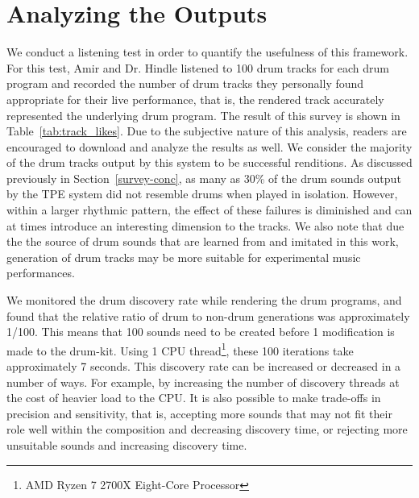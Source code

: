\documentclass[\main/thesis.tex]{subfiles}
\begin{document}
\section{Analyzing the Outputs}
 We conduct a listening test in order to quantify the usefulness of this framework. For this test, Amir and Dr. Hindle  listened to 100 drum tracks for each drum program and recorded the number of drum tracks they personally found appropriate for their live performance, that is, the rendered track accurately represented the underlying drum program. The result of this survey is shown in Table~\ref{tab:track_likes}. Due to the subjective nature of this analysis, readers are encouraged to download and analyze the results as well. We consider the majority of the drum tracks output by this system to be successful renditions. As discussed previously in Section~\ref{survey-conc}, as many as 30\% of the drum sounds output by the TPE system did not resemble drums when played in isolation. However, within a larger rhythmic pattern, the effect of these failures is diminished and can at times introduce an interesting dimension to the tracks. We also note that due the the source of drum sounds that are learned from and imitated in this work, generation of drum tracks may be more suitable for experimental music performances.
 
  We monitored the drum discovery rate while rendering the drum programs, and found that the relative ratio of drum to non-drum generations was approximately 1/100. This means that 100 sounds need to be created before 1 modification is made to the drum-kit. Using 1 CPU thread\footnote{AMD Ryzen 7 2700X Eight-Core Processor}, these 100 iterations take approximately 7 seconds. This discovery rate can be increased or decreased in a number of ways. For example, by increasing the number of discovery threads at the cost of heavier load to the CPU. It is also possible to make trade-offs in precision and sensitivity, that is, accepting more sounds that may not fit their role well within the composition and decreasing discovery time, or rejecting more unsuitable sounds and increasing discovery time. 
\begin{table}[tbp]
\caption{\label{tab:track_likes} Measuring the quality of generated drum tracks by calculating the percentage of liked outputs for each listener.}
\end{table}
\end{document}
